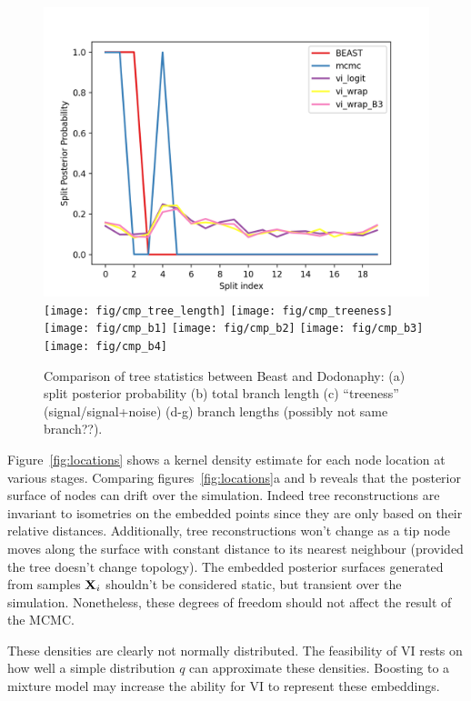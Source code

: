 \documentclass[11pt]{article}
\begin{document}
\begin{figure}[htbp]
\begin{center}
\includegraphics[width=.333\linewidth]{fig/cmp_splits}%
\texttt{[image: fig/cmp\_tree\_length]}%
\texttt{[image: fig/cmp\_treeness]}
\texttt{[image: fig/cmp\_b1]}%
\texttt{[image: fig/cmp\_b2]}%
\texttt{[image: fig/cmp\_b3]}%
\texttt{[image: fig/cmp\_b4]}
\caption{Comparison of tree statistics between Beast and Dodonaphy: (a) split posterior probability (b) total branch length (c) ``treeness'' (signal/signal+noise) (d-g) branch lengths (possibly not same branch??).}
\label{fig:stat_cmp}
\end{center}
\end{figure}

Figure~\ref{fig:locations} shows a kernel density estimate for each node location at various stages.
Comparing figures~\ref{fig:locations}a and b reveals that the posterior surface of nodes can drift over the simulation.
Indeed tree reconstructions are invariant to isometries on the embedded points since they are only based on their relative distances.
Additionally, tree reconstructions won't change as a tip node moves along the surface with constant distance to its nearest neighbour (provided the tree doesn't change topology).
The embedded posterior surfaces generated from samples $\bold{X}_{i}$ shouldn't be considered static, but transient over the simulation.
Nonetheless, these degrees of freedom should not affect the result of the MCMC.

These densities are clearly not normally distributed.
The feasibility of VI rests on how well a simple distribution $q$ can approximate these densities.
Boosting to a mixture model may increase the ability for VI to represent these embeddings.
	
\end{document}

